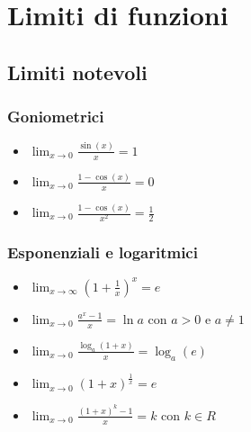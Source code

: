 
\section{Limiti di funzioni}

\subsection{Limiti notevoli}

\subsubsection*{Goniometrici}

\begin{itemize}
    \item $\lim_{x\to0}\frac{\sin(x)}{x}=1$
    \item $\lim_{x\to0}\frac{1-\cos(x)}{x}=0$
    \item $\lim_{x\to0}\frac{1-\cos(x)}{x^2}=\frac{1}{2}$
\end{itemize}

\subsubsection*{Esponenziali e logaritmici}

\begin{itemize}
    \item $\lim_{x\to\infty}(1+\frac{1}{x})^x=e$
    \item $\lim_{x\to0}\frac{a^x-1}{x}=\ln{a}$ con $a>0$ e $a \neq 1$
    \item $\lim_{x\to0}\frac{\log_{a}(1+x)}{x}=\log_{a}(e)$
    \item $\lim_{x\to0}(1+x)^{\frac{1}{x}}=e$
    \item $\lim_{x\to0}\frac{(1+x)^k-1}{x}=k$ con $k \in R$
\end{itemize}